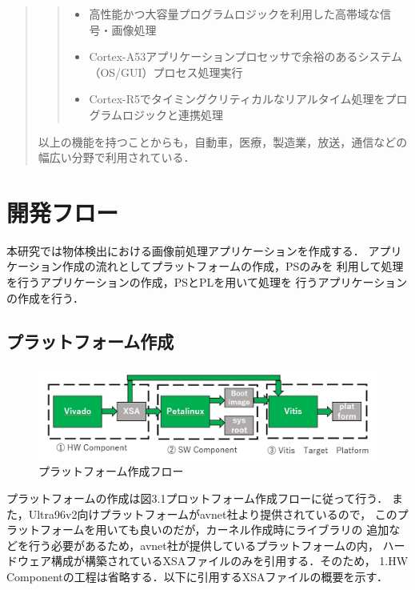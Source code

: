 \documentclass[11pt,a4j]{jreport}
\begin{document}
\begin{quote}
\begin{itemize}
    \begin{quote}
      \begin{itemize}
        \item 高性能かつ大容量プログラムロジックを利用した高帯域な信号・画像処理
        \item Cortex-A53アプリケーションプロセッサで余裕のあるシステム（OS/GUI）プロセス処理実行
        \item Cortex-R5でタイミングクリティカルなリアルタイム処理をプログラムロジックと連携処理
      \end{itemize}
    \end{quote}
    以上の機能を持つことからも，自動車，医療，製造業，放送，通信などの幅広い分野で利用されている．
  \end{itemize}
\end{quote}
\section{開発フロー}
本研究では物体検出における画像前処理アプリケーションを作成する．
アプリケーション作成の流れとしてプラットフォームの作成，PSのみを
利用して処理を行うアプリケーションの作成，PSとPLを用いて処理を
行うアプリケーションの作成を行う．
\subsection{プラットフォーム作成}
\begin{figure}[H]
  \center
  \includegraphics[scale = 0.7]{pict/pict1.jpg}
  \caption{プラットフォーム作成フロー}
 \end{figure}
 プラットフォームの作成は図3.1プロットフォーム作成フローに従って行う．
 また，Ultra96v2向けプラットフォームがavnet社より提供されているので，
 このプラットフォームを用いても良いのだが，カーネル作成時にライブラリの
 追加などを行う必要があるため，avnet社が提供しているプラットフォームの内，
 ハードウェア構成が構築されているXSAファイルのみを引用する．そのため，
 1.HW Componentの工程は省略する．以下に引用するXSAファイルの概要を示す．
\end{document}
